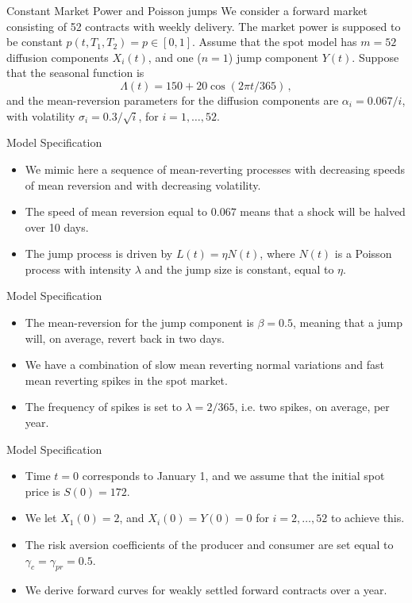 {Constant Market Power and Poisson jumps}
We consider a forward market consisting of 52 contracts with weekly delivery.
The market power is supposed to be constant $p(t,T_1,T_2)=p\in[0,1]$.
Assume that the spot model has $m=52$ diffusion components $X_i(t)$, and
one ($n=1$) jump component $Y(t)$. Suppose that the seasonal
function is
$$
\Lambda(t)=150+20\cos(2\pi t/365)\,,
$$
and the mean-reversion parameters for the diffusion components are
$\alpha_i=0.067/i$, with volatility $\sigma_i=0.3/\sqrt{i}$, for
$i=1,\ldots,52$.


{Model Specification}

\begin{itemize}
\item<1-> We mimic here a sequence of mean-reverting
processes with decreasing speeds of mean reversion and with
decreasing volatility.
\item<2-> The speed of mean reversion equal to
$0.067$ means that a shock will be halved over 10 days.
\item<3-> The jump
process is driven by $L(t)=\eta N(t)$, where $N(t)$ is a Poisson
process with intensity $\lambda$ and the jump
 size is constant, equal to $\eta$.
\end{itemize}


{Model Specification}

\begin{itemize}
\item<1-> The mean-reversion for the jump component is $\beta=0.5$, meaning
that a jump will, on average, revert back in two days.
\item<2-> We have
a combination of slow mean reverting normal variations and fast mean
reverting spikes in the spot market.
\item<3-> The frequency of spikes is set
to $\lambda=2/365$, i.e. two spikes, on average, per year.

\end{itemize}


{Model Specification}
\begin{itemize}
\item<1-> Time $t=0$ corresponds to January 1, and we assume that the initial spot
price is $S(0)=172$.
\item<2-> We let
$X_1(0)=2$, and $X_i(0)=Y(0)=0$ for $i=2,\ldots,52$ to achieve this.
\item<3-> The risk aversion coefficients of the producer and consumer are set
equal to $\gamma_c=\gamma_{pr}=0.5$.
\item<4-> We derive
forward curves for weakly settled forward contracts over a year.

\end{itemize}


